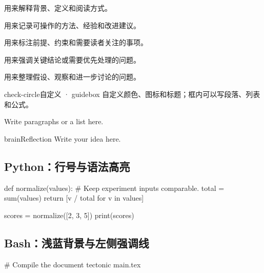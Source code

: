 \documentclass[11pt,a4paper,fontset=fandol]{ctexart}
\begin{document}
\clearpage
{}
\begin{infobox}[信息 · infobox]
用来解释背景、定义和阅读方式。
\end{infobox}
\begin{tipbox}[建议 · tipbox]
用来记录可操作的方法、经验和改进建议。
\end{tipbox}
\begin{warningbox}[注意 · warningbox]
用来标注前提、约束和需要读者关注的事项。
\end{warningbox}
\begin{importantbox}[重点 · importantbox]
用来强调关键结论或需要优先处理的问题。
\end{importantbox}
\begin{reflectionbox}[思考 · reflectionbox]
用来整理假设、观察和进一步讨论的问题。
\end{reflectionbox}
\begin{guidebox}[emeraldgreen]{check-circle}{自定义 · guidebox}
自定义颜色、图标和标题；框内可以写段落、列表和公式。
\end{guidebox}
\begin{texcode}
\begin{tipbox}[My suggestion]
Write paragraphs or a list here.
\end{tipbox}

\begin{guidebox}[royalpurple]{brain}{Reflection}
Write your idea here.
\end{guidebox}
\end{texcode}

\clearpage
{}
\subsection{Python：行号与语法高亮}
\begin{pythoncode}[caption={数据归一化示例}]
def normalize(values):
    # Keep experiment inputs comparable.
    total = sum(values)
    return [v / total for v in values]

scores = normalize([2, 3, 5])
print(scores)
\end{pythoncode}
\subsection{Bash：浅蓝背景与左侧强调线}
\begin{bashcode}
# Compile the document
tectonic main.tex
\end{bashcode}
\end{document}
